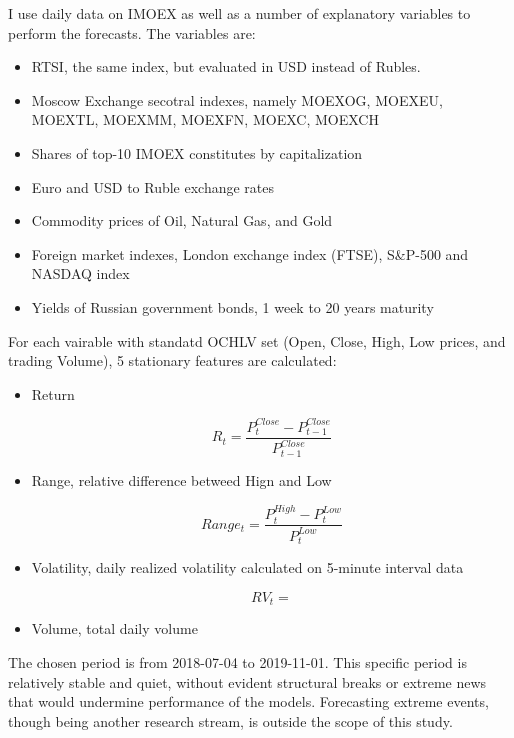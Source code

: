 \documentclass[stu]{apa7}
\begin{document}
I use daily data on IMOEX as well as a number of explanatory variables to perform the forecasts. The variables are:

\begin{itemize}
\item RTSI, the same index, but evaluated in USD instead of Rubles.
\item Moscow Exchange secotral indexes, namely MOEXOG, MOEXEU, MOEXTL, MOEXMM, MOEXFN, MOEXC, MOEXCH
\item Shares of top-10 IMOEX constitutes by capitalization
\item Euro and USD to Ruble exchange rates
\item Commodity prices of Oil, Natural Gas, and Gold
\item Foreign market indexes, London exchange index (FTSE), S\&P-500 and NASDAQ index
\item Yields of Russian government bonds, 1 week to 20 years maturity
\end{itemize}

For each vairable with standatd OCHLV set (Open, Close, High, Low prices, and trading Volume), 5 stationary features are calculated:

\begin{itemize}
\item Return

\begin{equation}
R_t = \frac{P^{Close}_t - P^{Close}_{t-1}}{P^{Close}_{t-1}}
\end{equation}

\item Range, relative difference betweed Hign and Low

\begin{equation}
Range_t = \frac{P^{High}_t - P^{Low}_{t}}{P^{Low}_{t}}
\end{equation}

\item Volatility, daily realized volatility calculated on 5-minute interval data

\begin{equation}
RV_t =
\end{equation}

\item Volume, total daily volume
\end{itemize}

The chosen period is from 2018-07-04 to 2019-11-01. This specific period is relatively stable and quiet, without evident structural breaks or extreme news that would undermine performance of the models. Forecasting extreme events, though being another research stream, is outside the scope of this study.
\end{document}
